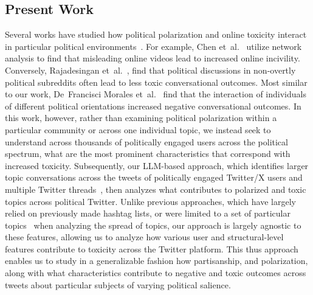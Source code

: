 \subsection{Present Work}
Several works have studied how political polarization and online toxicity interact in particular political environments~\cite{cinelli2021dynamics,tucker2018social,bail2018exposure}. For example, Chen {et~al.}~\cite{chen2022misleading} utilize network analysis to find that misleading online videos lead to increased online incivility. Conversely, Rajadesingan {et~al.}~\cite{rajadesingan2021political}, find that political discussions in non-overtly political subreddits often lead to less toxic conversational outcomes. Most similar to our work, De~Francisci Morales {et~al.}~\cite{de2021no} find that the interaction of individuals of different political orientations increased negative conversational outcomes. In this work, however, rather than examining political polarization within a particular community or across one individual topic, we instead seek to understand across thousands of politically engaged users across the political spectrum, what are the most prominent characteristics that correspond with increased toxicity. Subsequently, our LLM-based approach, which identifies larger topic conversations across the tweets of politically engaged Twitter/X users and multiple Twitter threads~\cite{wieringa2018political, quercia2012social,arslan2022understanding}, then analyzes what contributes to polarized and toxic topics across political Twitter. Unlike previous approaches, which have largely relied on previously made hashtag lists, or were limited to a set of particular topics~\cite{cinelli2020echo} when analyzing the spread of topics, our approach is largely agnostic to these features, allowing us to analyze how various user and structural-level features contribute to toxicity across the Twitter platform. This thus approach enables us to study in a generalizable fashion how partisanship, and polarization, along with what characteristics contribute to negative and toxic outcomes across tweets about particular subjects of varying political salience.




